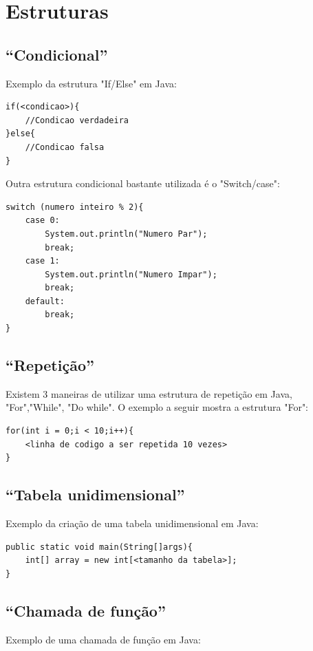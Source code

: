 \documentclass[
	12pt,				%
	openright,			%
	oneside,			%
	a4paper,			%
	english,			%
	french,				%
	spanish,			%
	brazil				%
	]{abntex2}
\begin{document}
\section{Estruturas}

\subsection{“Condicional”}

Exemplo da estrutura "If/Else" em Java:
\begin{lstlisting}
if(<condicao>){ 
	//Condicao verdadeira
}else{
	//Condicao falsa
}
\end{lstlisting}

Outra estrutura condicional bastante utilizada é o "Switch/case":

\begin{lstlisting}
switch (numero inteiro % 2){
	case 0:
		System.out.println("Numero Par");
		break;
	case 1:
		System.out.println("Numero Impar");
		break;
	default:
		break;
}
\end{lstlisting}

\subsection{“Repetição”}

Existem 3 maneiras de utilizar uma estrutura de repetição em Java, "For","While", "Do while". O exemplo a seguir mostra a estrutura "For":

\begin{lstlisting}
for(int i = 0;i < 10;i++){ 
	<linha de codigo a ser repetida 10 vezes>
} 
\end{lstlisting}

\subsection{“Tabela unidimensional”}

Exemplo da criação de uma tabela unidimensional em Java:

\begin{lstlisting}
public static void main(String[]args){ 
	int[] array = new int[<tamanho da tabela>];
}
\end{lstlisting}

\subsection{“Chamada de função”}

Exemplo de uma chamada de função em Java:
\end{document}
